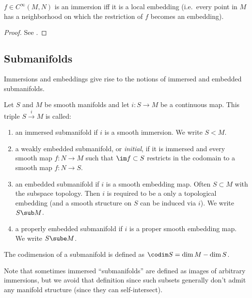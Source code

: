 \begin{thm}\label{thm.local embedding}
$f\in C^\infty (M,N)$ is an immersion iff it is a local embedding (i.e.\ every point in $M$ has a neighborhood on which the restriction of $f$ becomes an embedding). 
\end{thm}
\begin{proof}
See \cite[Thm 4.25]{Lee}.
\end{proof}

\subsection{Submanifolds}
Immersions and embeddings give rise to the notions of immersed and embedded submanifolds.

\begin{defn}
Let $S$ and $M$ be smooth manifolds and let $i:S\to M$ be a continuous map. This triple $S\overset{i}{\to}M$ is called:
\begin{enumerate}
    \item an immersed submanifold if $i$ is a smooth immersion. We write $S<M$.
    \item  a weakly embedded submanifold, or \emph{initial}, if it is immersed and every smooth map $f:N\to M$ such that $\im f\subset S$ restricts in the codomain to a smooth map $f:N\to S$.
    \item an embedded submanifold if $i$ is a smooth embedding map. Often $S\subset M$ with the subspace topology. Then $i$ is required to be a only a topological embedding (and a smooth structure on $S$ can be induced via $i$). We write $S\sub M$.
    \item a properly embedded submanifold if $i$ is a proper smooth embedding map. We write $S\sube M$.
\end{enumerate}
The codimension  of a submanifold is defined as $\codim S=\dim M -\dim S$.
\end{defn}

Note that sometimes immersed ``submanifolds'' are defined as images of arbitrary immersions, but we avoid that definition since such subsets generally don't admit any manifold structure (since they can self-intersect).

